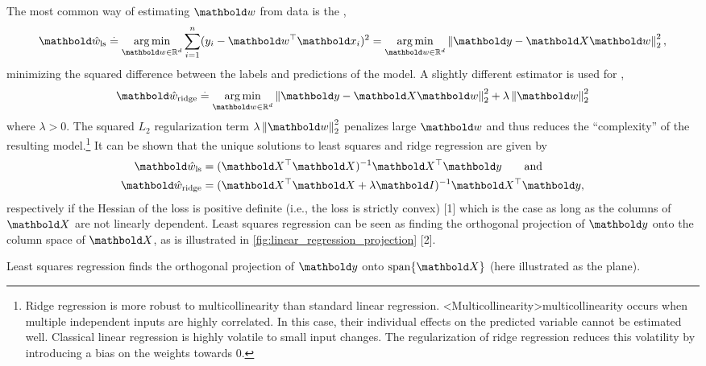 The most common way of estimating $\vw$ from data is the , \begin{align}
  \vwhat_{\ls} \defeq \argmin_{\vw \in \R^d} \sum_{i=1}^n (y_i - \transpose{\vw} \vx_i)^2 = \argmin_{\vw \in \R^d} \norm{\vy - \mX\vw}_2^2, \label{eq:least_squares}
\end{align} minimizing the squared difference between the labels and predictions of the model.
A slightly different estimator is used for , \begin{align}
  \vwhat_{\ridge} \defeq \argmin_{\vw \in \R^d} \norm{\vy - \mX\vw}_2^2 + \lambda \norm{\vw}_2^2
\end{align} where $\lambda > 0$.
The squared $L_2$ regularization term $\lambda \norm{\vw}_2^2$ penalizes large $\vw$ and thus reduces the ``complexity'' of the resulting model.\footnote[][-\baselineskip]{Ridge regression is more robust to multicollinearity than standard linear regression. \idx<Multicollinearity>{multicollinearity} occurs when multiple independent inputs are highly correlated. In this case, their individual effects on the predicted variable cannot be estimated well. Classical linear regression is highly volatile to small input changes. The regularization of ridge regression reduces this volatility by introducing a bias on the weights towards $0$.}
It can be shown that the unique solutions to least squares and ridge regression are given by \begin{align}
  \vwhat_{\ls} &= \inv{(\transpose{\mX} \mX)} \transpose{\mX} \vy \label{eq:linear_regression} \qquad\text{and} \\
  \vwhat_{\ridge} &= \inv{(\transpose{\mX} \mX + \lambda \mI)} \transpose{\mX} \vy, \label{eq:ridge_regression}
\end{align} respectively if the Hessian of the loss is positive definite (i.e., the loss is strictly convex) [1] which is the case as long as the columns of $\mX$ are not linearly dependent.
Least squares regression can be seen as finding the orthogonal projection of $\vy$ onto the column space of $\mX$, as is illustrated in \cref{fig:linear_regression_projection} [2].

\begin{marginfigure}[9\baselineskip]
  \caption{Least squares regression finds the orthogonal projection of $\vy$ onto $\mathrm{span}\{\mX\}$ (here illustrated as the plane).}
  \label{fig:linear_regression_projection}
\end{marginfigure}

